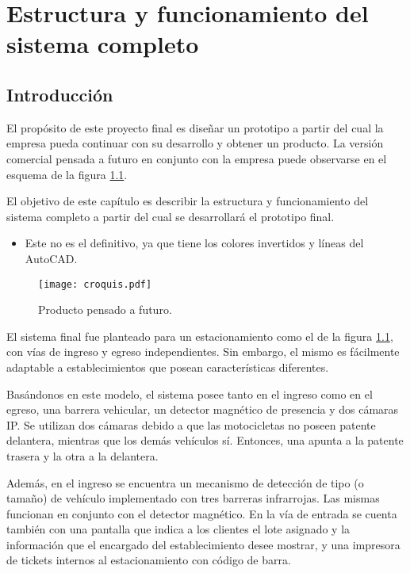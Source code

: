 \chapter{Estructura y funcionamiento del sistema completo}  \label{cap:estructura sist}

\section{Introducción}
El propósito de este proyecto final es diseñar un prototipo a partir del cual la empresa pueda continuar con su desarrollo y obtener un producto. La versión comercial pensada a futuro en conjunto con la empresa puede observarse en el esquema de la figura \ref{fig:img_croquis-est}.

El objetivo de este capítulo es describir la estructura y funcionamiento del sistema completo a partir del cual se desarrollará el prototipo final.

\begin{itemize}
	\item \textcolor{mGreen}{Este no es el definitivo, ya que tiene los colores invertidos y líneas del AutoCAD.}
	\end{itemize}

\begin{figure}[H]
	\centering
	\texttt{[image: croquis.pdf]}
	\caption{Producto pensado a futuro.}
	\label{fig:img_croquis-est}
\end{figure}



El sistema final fue planteado para un estacionamiento como el de la figura \ref{fig:img_croquis-est}, con vías de ingreso y egreso independientes. Sin embargo, el mismo es fácilmente adaptable a establecimientos que posean características diferentes. 

Basándonos en este modelo, el sistema posee tanto en el ingreso como en el egreso, una barrera vehicular, un detector magnético de presencia y dos cámaras IP.  Se utilizan dos cámaras debido a que las motocicletas no poseen patente delantera, mientras que los demás vehículos sí. Entonces, una apunta a la patente trasera y la otra a la delantera.

Además, en el ingreso se encuentra un mecanismo de detección de tipo (o tamaño) de vehículo implementado con tres barreras infrarrojas. Las mismas funcionan en conjunto con el detector magnético. En la vía de entrada se cuenta también con una pantalla que indica a los clientes el lote asignado y la información que el encargado del establecimiento desee mostrar, y una impresora de tickets internos al estacionamiento con código de barra.

